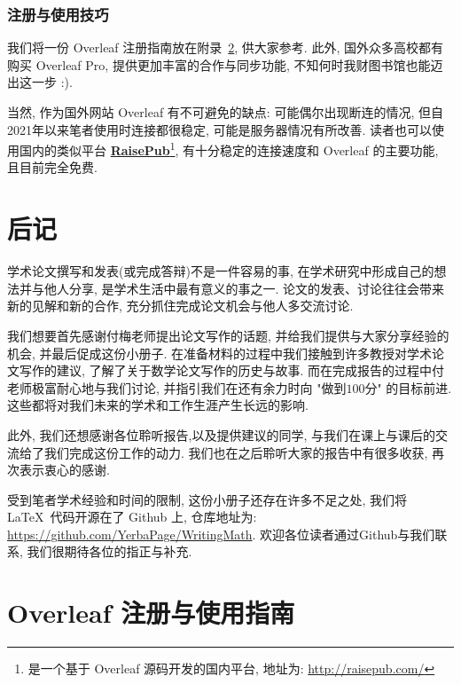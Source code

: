 \documentclass{formatBook}
\begin{document}
\subsection{注册与使用技巧}
我们将一份 Overleaf 注册指南放在附录~\ref{overleafGuide}, 供大家参考. 此外, 国外众多高校都有购买 Overleaf Pro, 提供更加丰富的合作与同步功能, 不知何时我财图书馆也能迈出这一步 :).

当然, 作为国外网站 Overleaf 有不可避免的缺点: 可能偶尔出现断连的情况, 但自2021年以来笔者使用时连接都很稳定, 可能是服务器情况有所改善. 读者也可以使用国内的类似平台 \textbf{\href{http://raisepub.com/}{RaisePub}}\footnote{是一个基于 Overleaf 源码开发的国内平台, 地址为: \url{http://raisepub.com/}}, 有十分稳定的连接速度和 Overleaf 的主要功能, 且目前完全免费.

\chapter{后记}
学术论文撰写和发表(或完成答辩)不是一件容易的事, 在学术研究中形成自己的想法并与他人分享, 是学术生活中最有意义的事之一. 论文的发表、讨论往往会带来新的见解和新的合作, 充分抓住完成论文机会与他人多交流讨论. 

我们想要首先感谢付梅老师提出论文写作的话题, 并给我们提供与大家分享经验的机会, 并最后促成这份小册子. 在准备材料的过程中我们接触到许多教授对学术论文写作的建议, 了解了关于数学论文写作的历史与故事. 而在完成报告的过程中付老师极富耐心地与我们讨论, 并指引我们在还有余力时向 "做到$100$分" 的目标前进. 这些都将对我们未来的学术和工作生涯产生长远的影响.

此外, 我们还想感谢各位聆听报告,以及提供建议的同学, 与我们在课上与课后的交流给了我们完成这份工作的动力. 我们也在之后聆听大家的报告中有很多收获, 再次表示衷心的感谢. 

受到笔者学术经验和时间的限制, 这份小册子还存在许多不足之处, 我们将 \LaTeX \ 代码开源在了 Github 上, 仓库地址为: \url{https://github.com/YerbaPage/WritingMath}. 欢迎各位读者通过Github与我们联系, 我们很期待各位的指正与补充.

\printbibliography
\appendix
\chapter{Overleaf 注册与使用指南}\label{overleafGuide}

\end{document}
